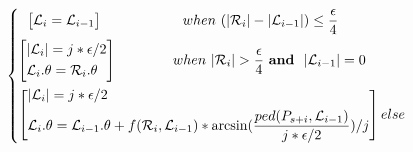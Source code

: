 \begin{small}
	\vspace{-1ex}
	\begin{equation*}
	\label{equ-function}
	\left\{
	\hspace{1ex}\begin{aligned}
	&\left[
	\begin{aligned}
	& \mathcal{L}_{i} = \mathcal{L}_{i-1}\\
	\end{aligned}
	\right]\hspace{12.5ex}~when~(|\mathcal{R}_{i}| - |\mathcal{L}_{i-1}|) \le \frac{\epsilon}{4}   \\
	&\hspace{-1.5ex}\left[
	\begin{aligned}
	& |\mathcal{L}_{i}|  = j*{\epsilon}/{2} \\
	& \mathcal{L}_{i}.\theta = \mathcal{R}_{i}.\theta    \\
	\end{aligned}
	\right]\hspace{8.5ex}~when~|\mathcal{R}_{i}| >  \frac{\epsilon}{4}~\And~|\mathcal{L}_{i-1}|=0    \\
	&\hspace{-1.5ex}\left[
	\begin{aligned}
	& |\mathcal{L}_{i}|  = j*{\epsilon}/{2}\\
	& \mathcal{L}_{i}.\theta = \mathcal{L}_{i-1}.\theta + f(\mathcal{R}_i,\mathcal{L}_{i-1})*\arcsin(\frac{ped(P_{s+i}, \mathcal{L}_{i-1})}{j*\epsilon/2})/j \\	
	\end{aligned}
	\right]\hspace{0ex}else\\
	\end{aligned}
	\right.
	\end{equation*}
	\vspace{0ex}
\end{small}


